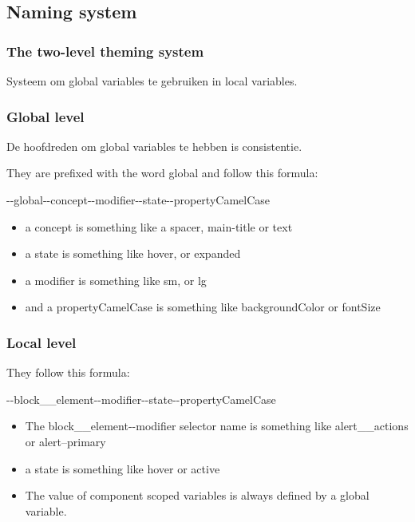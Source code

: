 \documentclass{article}
\begin{document}
\subsection{Naming system}

\subsubsection{The two-level theming system}

Systeem om global variables te gebruiken in local variables.

\subsubsection{Global level}

De hoofdreden om global variables te hebben is consistentie.

They are prefixed with the word global and follow this formula:

-{}-global-{}-concept-{}-modifier-{}-state-{}-propertyCamelCase

\begin{itemize}
    \item a concept is something like a spacer, main-title or text
    \item a state is something like hover, or expanded
    \item a modifier is something like sm, or lg
    \item and a propertyCamelCase is something like backgroundColor or fontSize
\end{itemize}

\subsubsection{Local level}

They follow this formula: 

-{}-block\_\_element-{}-modifier-{}-state-{}-propertyCamelCase

\begin{itemize}
    \item The block\_\_element-{}-modifier selector name is something like alert\_\_actions or alert--primary
    \item a state is something like hover or active
    \item The value of component scoped variables is always defined by a global variable.
\end{itemize}
\end{document}
